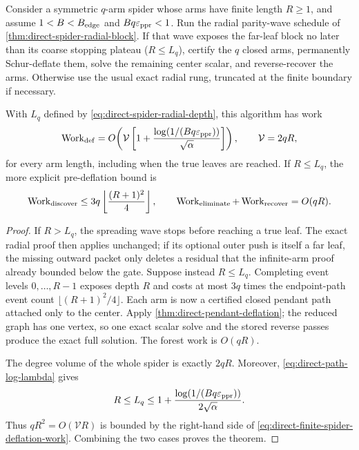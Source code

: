 \begin{theorem}
\label{thm:direct-finite-spider-deflation}
Consider a symmetric $q$-arm spider whose arms have finite length $R\geq1$,
and assume $1<B<B_{\rm edge}$ and $Bq\varepsilon_{\mathrm{ppr}}<1$.  Run the radial parity-wave
schedule of \cref{thm:direct-spider-radial-block}.  If that wave exposes the
far-leaf block no later than its coarse stopping plateau ($R\leq L_q$),
certify the $q$ closed arms, permanently Schur-deflate them, solve the
remaining center scalar, and reverse-recover the arms.  Otherwise use the
usual exact radial rung, truncated at the finite boundary if necessary.

With $L_q$ defined by \cref{eq:direct-spider-radial-depth}, this algorithm
has work
\begin{equation}
 \operatorname{Work}_{\rm def}
 =O\!\left(
  \mathcal V
  \left[1+\frac{\log(1/(Bq\varepsilon_{\mathrm{ppr}}))}{\sqrt\alpha}\right]
 \right),
 \qquad \mathcal V=2qR,
 \label{eq:direct-finite-spider-deflation-work}
\end{equation}
for every arm length, including when the true leaves are reached.
If $R\leq L_q$, the more explicit pre-deflation bound is
\begin{equation}
 \operatorname{Work}_{\rm discover}
 \leq3q\left\lfloor\frac{(R+1)^2}{4}\right\rfloor,
 \qquad
 \operatorname{Work}_{\rm eliminate}+\operatorname{Work}_{\rm recover}=O(qR).
 \label{eq:direct-finite-spider-explicit-work}
\end{equation}
\end{theorem}

\begin{proof}
If $R>L_q$, the spreading wave stops before reaching a true leaf.  The exact
radial proof then applies unchanged; if its optional outer push is itself a
far leaf, the missing outward packet only deletes a residual that the
infinite-arm proof already bounded below the gate.  Suppose instead
$R\leq L_q$.  Completing event levels $0,\ldots,R-1$ exposes depth $R$ and costs
at most $3q$ times the endpoint-path event count
$\lfloor(R+1)^2/4\rfloor$.  Each arm is now a certified closed pendant path
attached only to the center.  Apply \cref{thm:direct-pendant-deflation}; the
reduced graph has one vertex, so one exact scalar solve and the stored
reverse passes produce the exact full solution.  The forest work is
$O(qR)$.

The degree volume of the whole spider is exactly $2qR$.  Moreover,
\cref{eq:direct-path-log-lambda} gives
\begin{equation*}
 R\leq L_q
 \leq1+\frac{\log(1/(Bq\varepsilon_{\mathrm{ppr}}))}{2\sqrt\alpha}.
\end{equation*}
Thus $qR^2=O(\mathcal V R)$ is bounded by the right-hand side of
\cref{eq:direct-finite-spider-deflation-work}.  Combining the two cases
proves the theorem.
\end{proof}

